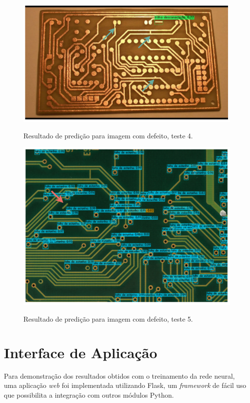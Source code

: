 \begin{figure}[H] %
  \centering
  \caption{Resultado de predição para imagem com defeito, teste 4.}
  \includegraphics[scale=0.95]{img/img-resultados-predicao-ruim-1.pdf}
  \label{fig:resultados-predicao-ruim-1}
\end{figure}

\begin{figure}[!h] %
  \centering
  \caption{Resultado de predição para imagem com defeito, teste 5.}
  \includegraphics[scale=0.95]{img/img-resultados-predicao-ruim-2.pdf}
  \label{fig:resultados-predicao-ruim-2}
\end{figure}

\chapter{Interface de Aplicação} \label{cap:api}
Para demonstração dos resultados obtidos com o treinamento da rede neural, uma aplicação \textit{web} foi implementada utilizando Flask, um \textit{framework} de fácil uso que possibilita a integração com outros módulos Python.

